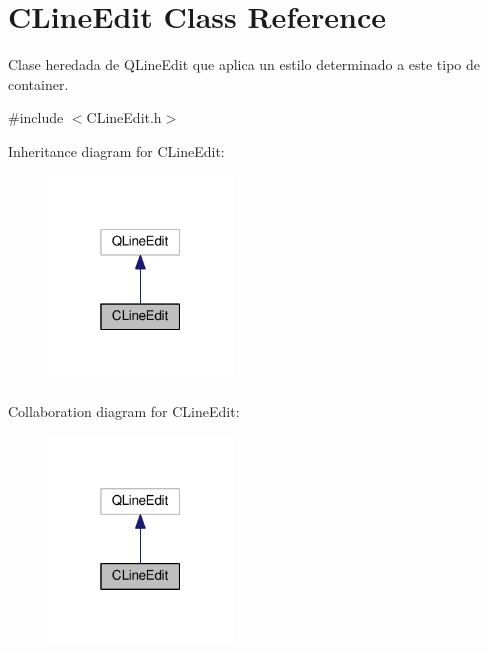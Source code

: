 \hypertarget{classCLineEdit}{}\section{C\+Line\+Edit Class Reference}
\label{classCLineEdit}


Clase heredada de \textquotesingle{}Q\+Line\+Edit\textquotesingle{} que aplica un estilo determinado a este tipo de container.  




{\ttfamily \#include $<$C\+Line\+Edit.\+h$>$}



Inheritance diagram for C\+Line\+Edit\+:\nopagebreak
\begin{figure}[H]
\begin{center}
\leavevmode
\includegraphics[width=139pt]{classCLineEdit__inherit__graph}
\end{center}
\end{figure}


Collaboration diagram for C\+Line\+Edit\+:\nopagebreak
\begin{figure}[H]
\begin{center}
\leavevmode
\includegraphics[width=139pt]{classCLineEdit__coll__graph}
\end{center}
\end{figure}
